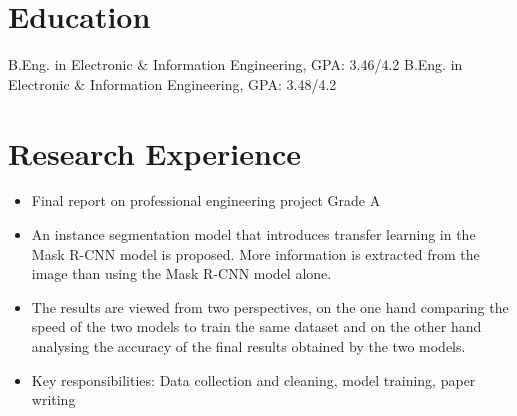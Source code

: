 \documentclass{resume}
\begin{document}



\section{Education}
B.Eng. in Electronic & Information Engineering, GPA: 3.46/4.2
B.Eng. in Electronic & Information Engineering, GPA: 3.48/4.2

\section{Research Experience}
\begin{itemize}
  \item Final report on professional engineering project   Grade A
  \item An instance segmentation model that introduces transfer learning in the Mask R-CNN model is proposed. More information is extracted from the image than using the Mask R-CNN model alone.
  \item The results are viewed from two perspectives, on the one hand comparing the speed of the two models to train the same dataset and on the other hand analysing the accuracy of the final results obtained by the two models.
  \item Key responsibilities: Data collection and cleaning, model training, paper writing
\end{itemize}
\end{document}
